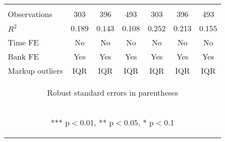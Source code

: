 \documentclass[]{article}
\begin{document}
\begin{center}
\begin{tabular}{lcccccc}
\vspace{4pt} & \begin{footnotesize}\end{footnotesize} & \begin{footnotesize}\end{footnotesize} & \begin{footnotesize}\end{footnotesize} & \begin{footnotesize}\end{footnotesize} & \begin{footnotesize}\end{footnotesize} & \begin{footnotesize}\end{footnotesize} \\
Observations & 303 & 396 & 493 & 303 & 396 & 493 \\
$R^2$ & 0.189 & 0.143 & 0.108 & 0.252 & 0.213 & 0.155 \\
Time FE & No & No & No & No & No & No \\
Bank FE & Yes & Yes & Yes & Yes & Yes & Yes \\
 Markup outliers & IQR & IQR & IQR & IQR & IQR & IQR \\ \hline
\multicolumn{7}{c}{\begin{footnotesize} Robust standard errors in parentheses\end{footnotesize}} \\
\multicolumn{7}{c}{\begin{footnotesize} *** p$<$0.01, ** p$<$0.05, * p$<$0.1\end{footnotesize}} \\
\end{tabular}
\end{center}
\end{document}
